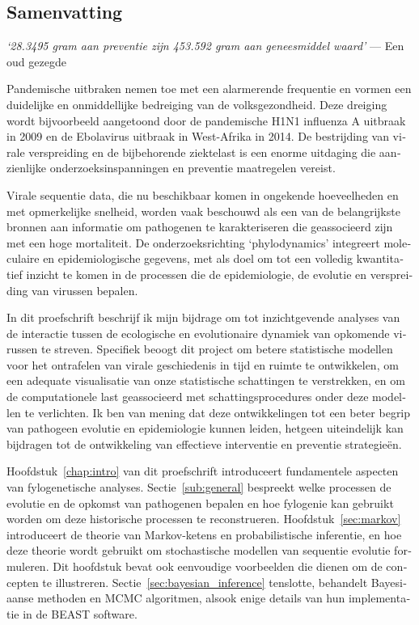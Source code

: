 
\begin{otherlanguage}{dutch}
\chapter*{Samenvatting}

\bigskip{}

\emph{`28.3495 gram aan preventie zijn 453.592 gram aan geneesmiddel waard'}
--- Een oud gezegde

\bigskip{}

Pandemische uitbraken nemen toe met een alarmerende frequentie en vormen een duidelijke en onmiddellijke bedreiging van de volksgezondheid.
Deze dreiging wordt bijvoorbeeld aangetoond door de pandemische H1N1 influenza A uitbraak in 2009 en de Ebolavirus uitbraak in West-Afrika in 2014.
De bestrijding van virale verspreiding en de bijbehorende ziektelast is een enorme uitdaging die aanzienlijke onderzoeksinspanningen en preventie maatregelen vereist.

Virale sequentie data, die nu beschikbaar komen in ongekende hoeveelheden en met opmerkelijke snelheid, worden vaak beschouwd als een van de belangrijkste bronnen aan informatie om pathogenen te karakteriseren die geassocieerd zijn met een hoge mortaliteit.
De onderzoeksrichting `phylodynamics' integreert moleculaire en epidemiologische gegevens, met als doel om tot een volledig kwantitatief inzicht te komen in de processen die de epidemiologie, de evolutie en verspreiding van virussen bepalen.

In dit proefschrift beschrijf ik mijn bijdrage om tot inzichtgevende analyses van de interactie tussen de ecologische en evolutionaire dynamiek van opkomende virussen te streven.
Specifiek beoogt dit project om betere statistische modellen voor het ontrafelen van virale geschiedenis in tijd en ruimte te ontwikkelen, om een adequate visualisatie van onze statistische schattingen te verstrekken, en om de computationele last geassocieerd met schattingsprocedures onder deze modellen te verlichten.
Ik ben van mening dat deze ontwikkelingen tot een beter begrip van pathogeen evolutie en epidemiologie kunnen leiden, hetgeen uiteindelijk kan bijdragen tot de ontwikkeling van effectieve interventie en preventie strategie\"en.

Hoofdstuk~\ref {chap:intro} van dit proefschrift introduceert fundamentele aspecten van fylogenetische analyses.
Sectie~\ref{sub:general} bespreekt welke processen de evolutie en de opkomst van pathogenen bepalen en hoe fylogenie kan gebruikt worden om deze historische processen te reconstrueren.
Hoofdstuk~\ref{sec:markov} introduceert de theorie van Markov-ketens en probabilistische inferentie, en hoe deze theorie wordt gebruikt om stochastische modellen van sequentie evolutie formuleren.
Dit hoofdstuk bevat ook eenvoudige voorbeelden die dienen om de concepten te illustreren.
Sectie~\ref{sec:bayesian_inference} tenslotte, behandelt Bayesiaanse methoden en MCMC algoritmen, alsook enige details van hun implementatie in de BEAST software.


\end{otherlanguage}
